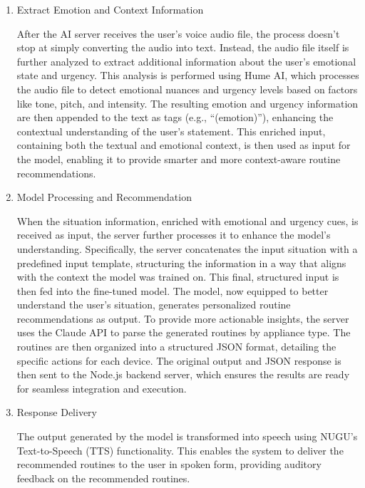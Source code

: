 \documentclass[conference]{IEEEtran}
\begin{document}
\begin{enumerate}[label=\arabic*]
\begin{enumerate}[label=\arabic*)]
        \item Extract Emotion and Context Information\par
        \vspace{0.3em}
        After the AI server receives the user’s voice audio file, the process doesn’t stop at simply converting the audio into text. Instead, the audio file itself is further analyzed to extract additional information about the user’s emotional state and urgency. This analysis is performed using Hume AI, which processes the audio file to detect emotional nuances and urgency levels based on factors like tone, pitch, and intensity. The resulting emotion and urgency information are then appended to the text as tags (e.g., “(emotion)”), enhancing the contextual understanding of the user’s statement. This enriched input, containing both the textual and emotional context, is then used as input for the model, enabling it to provide smarter and more context-aware routine recommendations.

        \vspace{0.5em}

        \item Model Processing and Recommendation\par
        \vspace{0.3em}
        When the situation information, enriched with emotional and urgency cues, is received as input, the server further processes it to enhance the model’s understanding. Specifically, the server concatenates the input situation with a predefined input template, structuring the information in a way that aligns with the context the model was trained on. This final, structured input is then fed into the fine-tuned model. The model, now equipped to better understand the user’s situation, generates personalized routine recommendations as output. To provide more actionable insights, the server uses the Claude API to parse the generated routines by appliance type. The routines are then organized into a structured JSON format, detailing the specific actions for each device. The original output and  JSON response is then sent to the Node.js backend server, which ensures the results are ready for seamless integration and execution.

        \vspace{0.5em}

        \item Response Delivery\par
        \vspace{0.3em}
        The output generated by the model is transformed into speech using NUGU’s Text-to-Speech (TTS) functionality. This enables the system to deliver the recommended routines to the user in spoken form, providing auditory feedback on the recommended routines.
    \end{enumerate}
\end{enumerate}
\end{document}
